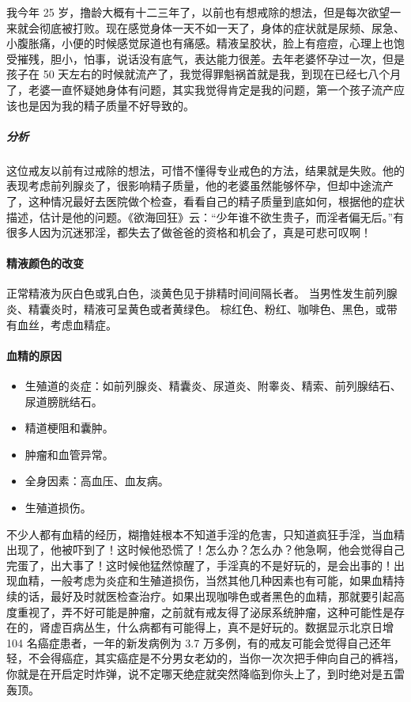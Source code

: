 \begin{case}[不孕不育]
    我今年 25 岁，撸龄大概有十二三年了，以前也有想戒除的想法，但是每次欲望一来就会彻底被打败。现在感觉身体一天不如一天了，身体的症状就是尿频、尿急、小腹胀痛，小便的时候感觉尿道也有痛感。精液呈胶状，脸上有痘痘，心理上也饱受摧残，胆小，怕事，说话没有底气，表达能力很差。去年老婆怀孕过一次，但是孩子在 50 天左右的时候就流产了，我觉得罪魁祸首就是我，到现在已经七八个月了，老婆一直怀疑她身体有问题，其实我觉得肯定是我的问题，第一个孩子流产应该也是因为我的精子质量不好导致的。
    \subparagraph{分析} 这位戒友以前有过戒除的想法，可惜不懂得专业戒色的方法，结果就是失败。他的表现考虑前列腺炎了，很影响精子质量，他的老婆虽然能够怀孕，但却中途流产了，这种情况最好去医院做个检查，看看自己的精子质量到底如何，根据他的症状描述，估计是他的问题。《欲海回狂》云：“少年谁不欲生贵子，而淫者偏无后。”有很多人因为沉迷邪淫，都失去了做爸爸的资格和机会了，真是可悲可叹啊！
\end{case}

\paragraph{精液颜色的改变}

正常精液为灰白色或乳白色，淡黄色见于排精时间间隔长者。
当男性发生前列腺炎、精囊炎时，精液可呈黄色或者黄绿色。
棕红色、粉红、咖啡色、黑色，或带有血丝，考虑血精症。

\paragraph{血精的原因}

\begin{itemize}
    \item 生殖道的炎症：如前列腺炎、精囊炎、尿道炎、附睾炎、精索、前列腺结石、尿道膀胱结石。
    \item 精道梗阻和囊肿。
    \item 肿瘤和血管异常。
    \item 全身因素：高血压、血友病。
    \item 生殖道损伤。
\end{itemize}

不少人都有血精的经历，糊撸娃根本不知道手淫的危害，只知道疯狂手淫，当血精出现了，他被吓到了！这时候他恐慌了！怎么办？怎么办？他急啊，他会觉得自己完蛋了，出大事了！这时候他猛然惊醒了，手淫真的不是好玩的，是会出事的！出现血精，一般考虑为炎症和生殖道损伤，当然其他几种因素也有可能，如果血精持续的话，最好及时就医检查治疗。如果出现咖啡色或者黑色的血精，那就要引起高度重视了，弄不好可能是肿瘤，之前就有戒友得了泌尿系统肿瘤，这种可能性是存在的，肾虚百病丛生，什么病都有可能得上，真不是好玩的。数据显示北京日增 104 名癌症患者，一年的新发病例为 3.7 万多例，有的戒友可能会觉得自己还年轻，不会得癌症，其实癌症是不分男女老幼的，当你一次次把手伸向自己的裤裆，你就是在开启定时炸弹，说不定哪天绝症就突然降临到你头上了，到时绝对是五雷轰顶。

